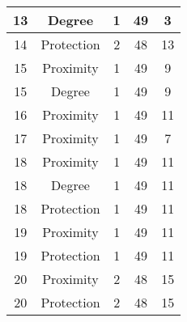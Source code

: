 \documentclass[results.tex]{subfiles}
\begin{document}
\begin{center}
\begin{tabular}{| c || c | c | c | c |}
            \hline
            13                      & Degree                       & 1                      & 49                      & 3                    \\
            \hline
            14                      & Protection                   & 2                      & 48                      & 13                   \\
            \hline
            15                      & Proximity                    & 1                      & 49                      & 9                    \\
            \hline
            15                      & Degree                       & 1                      & 49                      & 9                    \\
            \hline
            16                      & Proximity                    & 1                      & 49                      & 11                   \\
            \hline
            17                      & Proximity                    & 1                      & 49                      & 7                    \\
            \hline
            18                      & Proximity                    & 1                      & 49                      & 11                   \\
            \hline
            18                      & Degree                       & 1                      & 49                      & 11                   \\
            \hline
            18                      & Protection                   & 1                      & 49                      & 11                   \\
            \hline
            19                      & Proximity                    & 1                      & 49                      & 11                   \\
            \hline
            19                      & Protection                   & 1                      & 49                      & 11                   \\
            \hline
            20                      & Proximity                    & 2                      & 48                      & 15                   \\
            \hline
            20                      & Protection                   & 2                      & 48                      & 15                   \\

\end{tabular}
\end{center}
\end{document}
